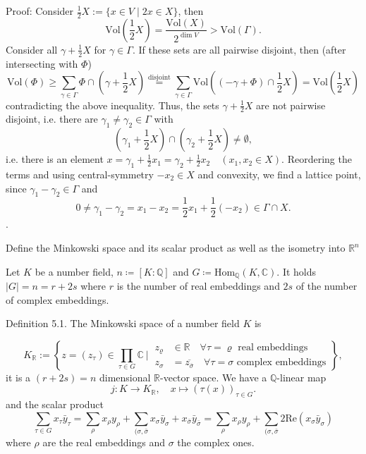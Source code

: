 Proof: 
Consider \(\frac{1}{2} X := \{ x \in V \mid 2x \in X \}\), then
\[
\text{Vol}\left(\frac{1}{2} X\right) = \frac{\text{Vol}(X)}{2^{\dim V}} > \text{Vol}(\Gamma).
\]
Consider all \(\gamma + \frac{1}{2} X\) for \(\gamma \in \Gamma\). If these sets are all pairwise disjoint, then (after intersecting with \(\Phi\))
\[
\text{Vol}(\Phi) \geq \sum_{\gamma \in \Gamma} \Phi \cap \left(\gamma + \frac{1}{2} X\right) \overset{\text{disjoint}}{=} \sum_{\gamma \in \Gamma} \text{Vol} \left((-\gamma + \Phi) \cap \frac{1}{2} X\right) = \text{Vol}\left(\frac{1}{2} X\right)
\]
contradicting the above inequality. Thus, the sets \(\gamma + \frac{1}{2} X\) are not pairwise disjoint, i.e. there are 
\(\gamma_1 \neq \gamma_2 \in \Gamma\) with
\[
\left(\gamma_1 + \frac{1}{2} X\right) \cap \left(\gamma_2 + \frac{1}{2} X\right) \neq \emptyset,
\]
i.e. there is an element \( x = \gamma_1 + \frac{1}{2} x_1 = \gamma_2 + \frac{1}{2} x_2 \quad (x_1, x_2 \in X)\). 
Reordering the terms and using central-symmetry \(-x_2 \in X\) and convexity, we find a lattice point,
since \( \gamma_1 - \gamma_2 \in \Gamma \) and
\[
0 \neq \gamma_1 - \gamma_2 = x_1 - x_2 = \frac{1}{2} x_1 + \frac{1}{2} (-x_2) \in \Gamma \cap X.
\].

Define the Minkowski space and its scalar product as well as the isometry into \( \mathbb{R}^n \)

Let \( K \) be a number field, \( n \coloneqq [K:\mathbb{Q}] \) and \( G \coloneqq \text{Hom}_{\mathbb{Q}}(K, \mathbb{C}) \). 
It holds \( |G| = n = r + 2s\) where \( r \) is the number of real embeddings and \( 2s \) of the number of complex embeddings.

Definition 5.1. The Minkowski space of a number field \(K\) is

\[
K_{\mathbb{R}} := \left\{ z = (z_{\tau}) \in \prod_{\tau \in G} \mathbb{C} \ \bigg| \ 
\begin{align*}
z_{\varrho} & \in \mathbb{R} \quad \forall \tau = \varrho \text{ real embeddings} \\
z_{\sigma} & = \overline{z_{\overline{\sigma}}} \quad \forall \tau = \sigma \text{ complex embeddings} 
\end{align*} 
\right\},
\]
it is a \((r + 2s) = n\) dimensional \(\mathbb{R}\)-vector space. We have a \(\mathbb{Q}\)-linear map
\[
j: K \to K_{\mathbb{R}}, \quad x \mapsto (\tau(x))_{\tau \in G}.
\]
and the scalar product
\[ \sum_{\tau \in G} x_\tau \bar{y}_\tau = \sum_{\rho} x_\rho y_\rho + \sum_{(\sigma, \bar{\sigma}} x_\sigma \bar{y}_\sigma + x_{\bar{\sigma}} \bar{y}_{\bar{\sigma}} = \sum_{\rho} x_\rho y_\rho + \sum_{(\sigma, \bar{\sigma}} 2\text{Re}(x_\sigma \bar{y}_\sigma)\]
where \( \rho \) are the real embeddings and \( \sigma \) the complex ones.

